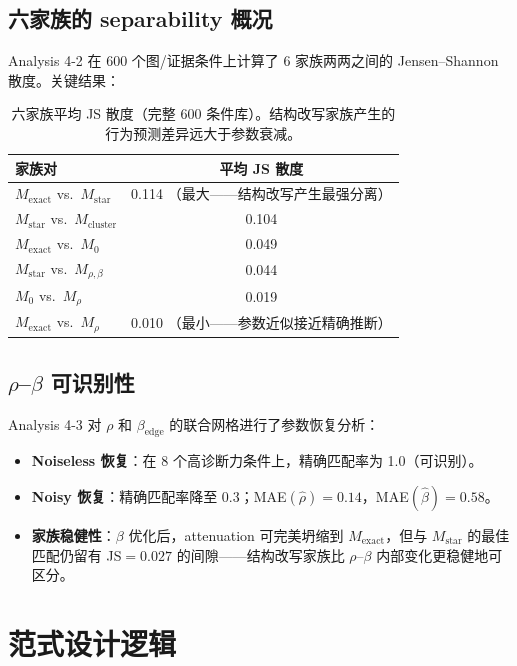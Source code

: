 \documentclass[11pt,a4paper]{ctexart}
\begin{document}
\subsection{六家族的 separability 概况}

Analysis 4-2 在 600 个图/证据条件上计算了 6 家族两两之间的 Jensen--Shannon 散度。关键结果：

\begin{table}[H]
\centering\small
\begin{tabular}{lc}
\toprule
家族对 & 平均 JS 散度 \\
\midrule
$M_\mathrm{exact}$ vs.\ $M_\mathrm{star}$ & 0.114 （最大——结构改写产生最强分离）\\
$M_\mathrm{star}$ vs.\ $M_\mathrm{cluster}$ & 0.104 \\
$M_\mathrm{exact}$ vs.\ $M_0$ & 0.049 \\
$M_\mathrm{star}$ vs.\ $M_{\rho,\beta}$ & 0.044 \\
$M_0$ vs.\ $M_\rho$ & 0.019 \\
$M_\mathrm{exact}$ vs.\ $M_\rho$ & 0.010 （最小——参数近似接近精确推断）\\
\bottomrule
\end{tabular}
\caption{六家族平均 JS 散度（完整 600 条件库）。结构改写家族产生的行为预测差异远大于参数衰减。}
\label{tab:js_matrix}
\end{table}

\subsection{$\rho$--$\beta$ 可识别性}

Analysis 4-3 对 $\rho$ 和 $\beta_\mathrm{edge}$ 的联合网格进行了参数恢复分析：
\begin{itemize}
    \item \textbf{Noiseless 恢复}：在 8 个高诊断力条件上，精确匹配率为 1.0（可识别）。
    \item \textbf{Noisy 恢复}：精确匹配率降至 0.3；MAE$(\hat\rho)=0.14$，MAE$(\hat\beta)=0.58$。
    \item \textbf{家族稳健性}：$\beta$ 优化后，attenuation 可完美坍缩到 $M_\mathrm{exact}$，但与 $M_\mathrm{star}$ 的最佳匹配仍留有 JS$=0.027$ 的间隙——结构改写家族比 $\rho$--$\beta$ 内部变化更稳健地可区分。
\end{itemize}


\section{范式设计逻辑}
\label{sec:paradigm}
\end{document}
